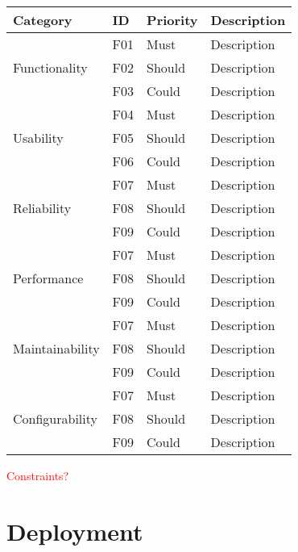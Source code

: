 \documentclass[11pt]{article}
\begin{document}
\begin{tabular}{|m{1in}|m{0.3in}|m{0.6in}|m{4.5in}|}
\hline
\textbf{Category}  & \textbf{ID}  & \textbf{Priority}        & \textbf{Description} \\
\hline\hline
\multirow{3}{*}{Functionality }
 & F01 & Must
 & Description \\  \cline{2-4}
 & F02 & Should
 & Description \\  \cline{2-4}
 & F03 & Could
 & Description \\ \hline

\multirow{3}{*}{Usability }
 & F04 & Must
 & Description \\  \cline{2-4}
 & F05 & Should
 & Description \\  \cline{2-4}
 & F06 & Could
 & Description \\ \hline

\multirow{3}{*}{Reliability }
 & F07 & Must
 & Description \\  \cline{2-4}
 & F08 & Should
 & Description \\  \cline{2-4}
 & F09 & Could
 & Description \\ \hline


\multirow{3}{*}{Performance }
 & F07 & Must
 & Description \\  \cline{2-4}
 & F08 & Should
 & Description \\  \cline{2-4}
 & F09 & Could
 & Description \\ \hline

\multirow{3}{*}{Maintainability}
 & F07 & Must
 & Description \\  \cline{2-4}
 & F08 & Should
 & Description \\  \cline{2-4}
 & F09 & Could
 & Description \\ \hline

\multirow{3}{*}{Configurability}
 & F07 & Must
 & Description \\  \cline{2-4}
 & F08 & Should
 & Description \\  \cline{2-4}
 & F09 & Could
 & Description \\ \hline
\end{tabular}

\textcolor{red}{Constraints?}

\section{Deployment}
\end{document}
